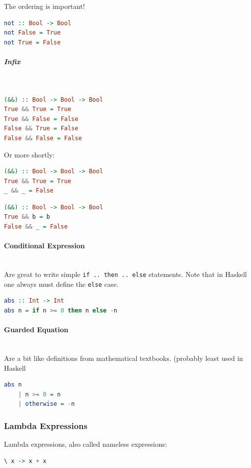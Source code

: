 The ordering is important!

\begin{lstlisting}[language=Haskell]
not :: Bool -> Bool
not False = True
not True = False
\end{lstlisting}

\subparagraph{Infix} \hfill \\

\begin{lstlisting}[language=Haskell]
(&&) :: Bool -> Bool -> Bool
True && True = True
True && False = False
False && True = False
False && False = False
\end{lstlisting}

Or more shortly:
\begin{lstlisting}[language=Haskell]
(&&) :: Bool -> Bool -> Bool
True && True = True
_ && _ = False
\end{lstlisting}

\begin{lstlisting}[language=Haskell]
(&&) :: Bool -> Bool -> Bool
True && b = b
False && _ = False
\end{lstlisting}

\paragraph{Conditional Expression} \hfill \\
Are great to write simple \lstinline|if .. then .. else| statements. Note that in Haskell one always must define the \lstinline|else| case.
\begin{lstlisting}[language=Haskell]
abs :: Int -> Int
abs n = if n >= 0 then n else -n
\end{lstlisting}

\paragraph{Guarded Equation} \hfill \\

Are a bit like definitions from mathematical textbooks. (probably least used in Haskell
\begin{lstlisting}[language=Haskell]
abs n
    | n >= 0 = n
    | otherwise = -n
\end{lstlisting}


\subsubsection{Lambda Expressions}
Lambda expressions, also called nameless expressions:
\begin{lstlisting}[language=Haskell]
\ x -> x + x
\end{lstlisting}

